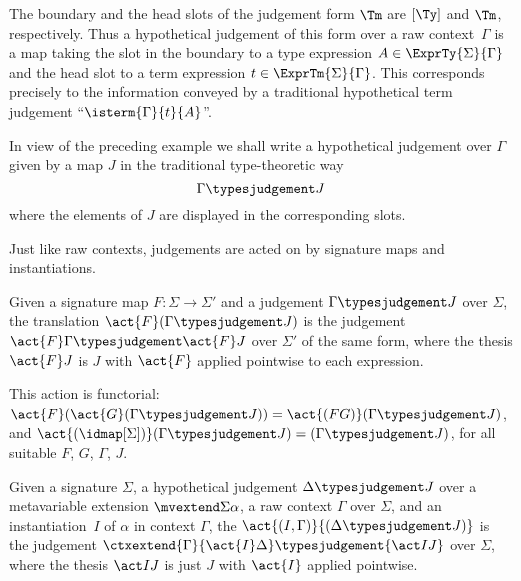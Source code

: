 \begin{example}
  The boundary and the head slots of the judgement form $\Tm$ are $[\Ty]$ and $\Tm$, respectively. Thus a hypothetical judgement of this form over a raw context~$\Gamma$ is a map taking the slot in the boundary to a type expression $A \in \ExprTy{\Sigma}{\Gamma}$ and the head slot to a term expression $t \in \ExprTm{\Sigma}{\Gamma}$.
  This corresponds precisely to the information conveyed by a traditional hypothetical term judgement ``$\isterm{\Gamma}{t}{A}$''.
\end{example}

In view of the preceding example we shall write a hypothetical judgement over $\Gamma$ given by a map $J$ in the traditional type-theoretic way
%
\begin{equation*}
  \Gamma \typesjudgement J
\end{equation*}
%
where the elements of $J$ are displayed in the corresponding slots.

Just like raw contexts, judgements are acted on by signature maps and instantiations.

\begin{definition} \label{def:judgements-functorial}
  Given a signature map $F : \Sigma \to \Sigma'$ and a judgement $\Gamma \typesjudgement J$ over $\Sigma$, the translation $\act{F}(\Gamma \typesjudgement J)$ is the judgement $\act{F} \Gamma \typesjudgement \act{F} J$ over $\Sigma'$ of the same form, where the thesis $\act{F} J$ is $J$ with $\act{F}$ applied pointwise to each expression.
\end{definition}

\begin{propositionwithqed} \label{prop:judgements-functorial}
  This action is functorial: $\act{F}(\act{G} (\Gamma \typesjudgement J)) = \act{(FG)}(\Gamma \typesjudgement J)$, and $\act{(\idmap[\Sigma])}(\Gamma \typesjudgement J) = (\Gamma \typesjudgement J)$, for all suitable $F$, $G$, $\Gamma$, $J$.
\end{propositionwithqed}

\begin{definition} \label{def:instantiate-judgement}
  Given a signature $\Sigma$, a hypothetical judgement $\Delta \typesjudgement J$ over a metavariable extension $\mvextend \Sigma \alpha$, a raw context $\Gamma$ over $\Sigma$, and an instantiation~$I$ of $\alpha$ in context $\Gamma$, the  $\act{(I,\Gamma)}{(\Delta \typesjudgement J)}$ is the judgement
  $\ctxextend{\Gamma}{\act{I} \Delta} \typesjudgement {\act I J}$ over $\Sigma$, where the thesis $\act I J$ is just $J$ with $\act{I}$ applied pointwise.
\end{definition}

